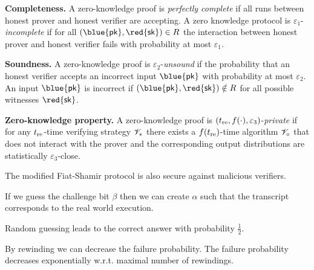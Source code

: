 \documentclass[landscape,dvips,footrule]{foils}
\renewcommand{\SK}{{\red{\mathsf{sk}}}}
\renewcommand{\PK}{{\blue{\mathsf{pk}}}}
\begin{document}
\enlargethispage{1cm}



\textbf{Completeness.} A zero-knowledge proof is \emph{perfectly
  complete} if all runs between honest prover and honest verifier are
accepting. A zero knowledge protocol is
$\varepsilon_1$-\emph{incomplete} if for all $(\PK,\SK)\in R$ the
interaction between honest prover and honest verifier fails with
probability at most $\varepsilon_1$.\vspace*{3ex}
 
\textbf{Soundness.} A zero-knowledge proof is
$\varepsilon_2$-\emph{unsound} if the probability that an honest
verifier accepts an incorrect input $\PK$ with probability at most
$\varepsilon_2$. An input $\PK$ is incorrect if $(\PK,\SK)\notin R$
for all possible witnesses $\SK$.\vspace*{3ex}

\textbf{Zero-knowledge property.}  A zero-knowledge proof is
$(t_{\mathrm{re}},f(\cdot),\varepsilon_3)$-\emph{private} if for any $t_{\mathrm{re}}$-time
verifying strategy $\mathscr{V}_*$ there exists a $f(t_{\mathrm{re}})$-time algorithm
$\mathscr{V}_{\circ}$ that does not interact with the prover and the
corresponding output distributions are statistically
$\varepsilon_3$-close.\vspace*{-2ex}






The modified Fiat-Shamir protocol is also secure against malicious verifiers.

\begin{triangles}
\item If we guess the challenge bit $\beta$ then we can create
  $\alpha$ such that the transcript corresponds to the real world
  execution.
\item Random guessing leads to the correct answer with probability
  $\frac{1}{2}$.
\item By rewinding we can decrease the failure probability. The
  failure probability decreases exponentially w.r.t. maximal number of rewindings.
\end{triangles}
\end{document}
